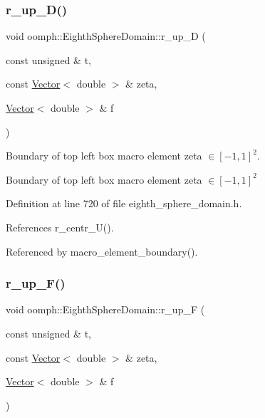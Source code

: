 \subsubsection{\texorpdfstring{r\+\_\+up\+\_\+\+D()}{r\_up\_D()}}
{\footnotesize\ttfamily void oomph\+::\+Eighth\+Sphere\+Domain\+::r\+\_\+up\+\_\+D (\begin{DoxyParamCaption}\item[{const unsigned \&}]{t,  }\item[{const \hyperlink{classoomph_1_1Vector}{Vector}$<$ double $>$ \&}]{zeta,  }\item[{\hyperlink{classoomph_1_1Vector}{Vector}$<$ double $>$ \&}]{f }\end{DoxyParamCaption})\hspace{0.3cm}{\ttfamily [private]}}



Boundary of top left box macro element zeta $ \in [-1,1]^2 $. 

Boundary of top left box macro element zeta $ \in [-1,1]^2 $ 

Definition at line 720 of file eighth\+\_\+sphere\+\_\+domain.\+h.



References r\+\_\+centr\+\_\+\+U().



Referenced by macro\+\_\+element\+\_\+boundary().

\mbox{\label{classoomph_1_1EighthSphereDomain_a9e419235f4800eab872523bdbfe72fb6}} 
\subsubsection{\texorpdfstring{r\+\_\+up\+\_\+\+F()}{r\_up\_F()}}
{\footnotesize\ttfamily void oomph\+::\+Eighth\+Sphere\+Domain\+::r\+\_\+up\+\_\+F (\begin{DoxyParamCaption}\item[{const unsigned \&}]{t,  }\item[{const \hyperlink{classoomph_1_1Vector}{Vector}$<$ double $>$ \&}]{zeta,  }\item[{\hyperlink{classoomph_1_1Vector}{Vector}$<$ double $>$ \&}]{f }\end{DoxyParamCaption})\hspace{0.3cm}{\ttfamily [private]}}



